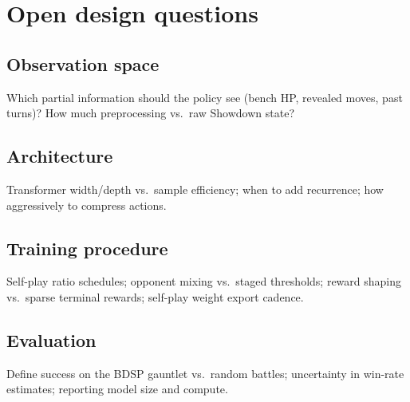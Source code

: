 \chapter{Open design questions}

\section{Observation space}
Which partial information should the policy see (bench HP, revealed moves, past turns)? How much preprocessing vs.\ raw Showdown state?

\section{Architecture}
Transformer width/depth vs.\ sample efficiency; when to add recurrence; how aggressively to compress actions.

\section{Training procedure}
Self-play ratio schedules; opponent mixing vs.\ staged thresholds; reward shaping vs.\ sparse terminal rewards; self-play weight export cadence.

\section{Evaluation}
Define success on the BDSP gauntlet vs.\ random battles; uncertainty in win-rate estimates; reporting model size and compute.
